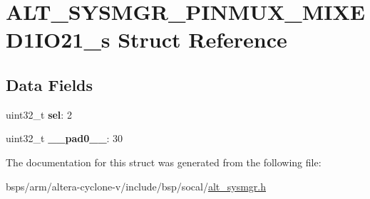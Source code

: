 \hypertarget{structALT__SYSMGR__PINMUX__MIXED1IO21__s}{}\section{A\+L\+T\+\_\+\+S\+Y\+S\+M\+G\+R\+\_\+\+P\+I\+N\+M\+U\+X\+\_\+\+M\+I\+X\+E\+D1\+I\+O21\+\_\+s Struct Reference}
\label{structALT__SYSMGR__PINMUX__MIXED1IO21__s}
\subsection*{Data Fields}
\begin{DoxyCompactItemize}
\item 
\mbox{\label{structALT__SYSMGR__PINMUX__MIXED1IO21__s_a8551cc32b6363ed81248ac833b4bf004}} 
uint32\+\_\+t {\bfseries sel}\+: 2
\item 
\mbox{\label{structALT__SYSMGR__PINMUX__MIXED1IO21__s_a417aa0300ddfca9e00194a0f33436795}} 
uint32\+\_\+t {\bfseries \+\_\+\+\_\+pad0\+\_\+\+\_\+}\+: 30
\end{DoxyCompactItemize}


The documentation for this struct was generated from the following file\+:\begin{DoxyCompactItemize}
\item 
bsps/arm/altera-\/cyclone-\/v/include/bsp/socal/\mbox{\hyperlink{alt__sysmgr_8h}{alt\+\_\+sysmgr.\+h}}\end{DoxyCompactItemize}
